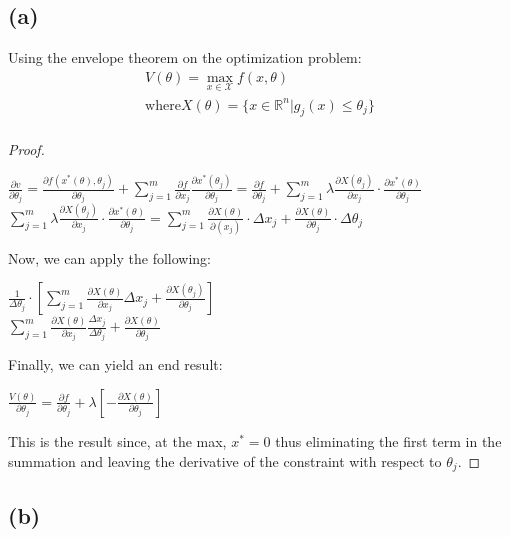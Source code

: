 \documentclass[10pt, a4paper]{article}
\begin{document}
  \subsection*{(a)}
    Using the envelope theorem on the optimization problem:
    \begin{gather*}
      V(\theta)=\max_{x\in\mathcal{X}} f(x,\theta) \\
      \text{where} X(\theta) = \{x\in\mathbb{R}^n|g_j(x)\leq\theta_j\} \\
    \end{gather*}
    \begin{proof}
      \begin{center}
        $\frac{\partial v}{\partial\theta_j} = \frac{\partial f(x^*(\theta),\theta_j)}{\partial\theta_j}
        +\sum\limits_{j=1}^m\frac{\partial f}{\partial x_j}\frac{\partial x^*(\theta_j)}{\partial\theta_j}
        = \frac{\partial f}{\partial\theta_j} + \sum\limits_{j=1}^m\lambda\frac{\partial X(\theta_j)}{\partial x_j}
        \cdot\frac{\partial x^*(\theta)}{\partial\theta_j}$ \\
        $\sum\limits_{j=1}^m\lambda\frac{\partial X(\theta_j)}{\partial x_j}\cdot\frac{\partial x^*(\theta)}{\partial\theta_j}
        = \sum\limits_{j=1}^m\frac{\partial X(\theta)}{\partial(x_j)}\cdot\Delta x_j + \frac{\partial X(\theta)}{\partial\theta_j}\cdot\Delta\theta_j$ \\
      \end{center}
      Now, we can apply the following:
      \begin{center}
        $\frac{1}{\Delta\theta_j}\cdot[\sum\limits_{j=1}^m\frac{\partial X(\theta)}{\partial x_j}\Delta x_j +
        \frac{\partial X(\theta_j)}{\partial\theta_j}]$ \\
        $\sum\limits_{j=1}^m\frac{\partial X(\theta)}{\partial x_j}\frac{\Delta x_j}{\Delta\theta_j} +
        \frac{\partial X(\theta)}{\partial\theta_j}$ \\
      \end{center}
      Finally, we can yield an end result:
      \begin{center}
        $\boxed{\frac{V(\theta)}{\partial\theta_j} = \frac{\partial f}{\partial \theta_j} + \lambda[-\frac{\partial X(\theta)}{\partial\theta_j}]}$
      \end{center}
      This is the result since, at the max, $x^*=0$ thus eliminating the first term in the summation and leaving the derivative of the
      constraint with respect to $\theta_j$.
    \end{proof}
  \subsection*{(b)}
    
\end{document}
